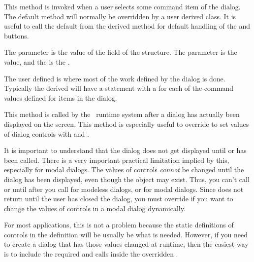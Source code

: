 This method is invoked when a user selects some command item
of the dialog. The default  method will
normally be overridden by a user derived class. It is useful to
call the default  from the derived method for
default handling of the  and 
buttons.

The  parameter is the value of the  field of
the  structure. The  parameter is
the  value, and the  is the .

The user defined  is where most of the work
defined by the dialog is done. Typically the derived
 will have a  statement with a
 for each of the command  values defined
for items in the dialog.


This method is called by the \V\ runtime system after a dialog
has actually been displayed on the screen. This method is especially
useful to override to set values of dialog controls with
 and .

It is important to understand that the dialog does not get
displayed until  or  has
been called. There is a very important practical limitation
implied by this, especially for modal dialogs. The values of
controls \emph{cannot} be changed until the dialog has been
displayed, even though the  object may exist. Thus,
you can't call  or  until after
you call  for modeless dialogs, or 
for modal dialogs. Since  does not return
until the user has closed the dialog, you must override 
if you want to change the values of controls in a modal dialog
dynamically.

For most applications, this is not a problem because the
static definitions of controls in the  definition
will be usually be what is needed. However, if you need to create
a dialog that has those values changed at runtime, then the
easiest way is to include the required  and
 calls inside the overridden .



